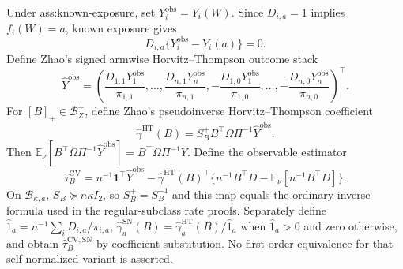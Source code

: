 Under ass:known-exposure, set \(Y_i^{\mathrm{obs}}=Y_i(W)\).  Since \(D_{i,a}=1\) implies \(f_i(W)=a\), known exposure gives
\[
D_{i,a}\{Y_i^{\mathrm{obs}}-Y_i(a)\}=0.
\]
Define Zhao's signed armwise Horvitz--Thompson outcome stack
\[
\widehat Y^{\mathrm{obs}}=
\left(\frac{D_{1,1}Y_1^{\mathrm{obs}}}{\pi_{1,1}},\ldots,
\frac{D_{n,1}Y_n^{\mathrm{obs}}}{\pi_{n,1}},
-\frac{D_{1,0}Y_1^{\mathrm{obs}}}{\pi_{1,0}},\ldots,
-\frac{D_{n,0}Y_n^{\mathrm{obs}}}{\pi_{n,0}}\right)^{\top}.
\]
For \([B]_+\in\mathcal B_Z^+\), define Zhao's pseudoinverse Horvitz--Thompson coefficient
\[
\widehat\gamma^{\mathrm{HT}}(B)=S_B^+B^{\top}\Omega\Pi^{-1}\widehat Y^{\mathrm{obs}}.
\]
Then \(\mathbb E_\nu[B^{\top}\Omega\Pi^{-1}\widehat Y^{\mathrm{obs}}]=B^{\top}\Omega\Pi^{-1}Y\).  Define the observable estimator
\[
\widehat\tau_B^{\mathrm{CV}}
=n^{-1}\mathbf1^{\top}\widehat Y^{\mathrm{obs}}
-\widehat\gamma^{\mathrm{HT}}(B)^{\top}
\{n^{-1}B^{\top}D-\mathbb E_\nu[n^{-1}B^{\top}D]\}.
\]
On \(\mathcal B_{\kappa,\overline a}\), \(S_B\succeq n\kappa I_2\), so \(S_B^+=S_B^{-1}\) and this map equals the ordinary-inverse formula used in the regular-subclass rate proofs.  Separately define \(\widehat1_a=n^{-1}\sum_iD_{i,a}/\pi_{i,a}\), \(\widehat\gamma_a^{\mathrm{SN}}(B)=\widehat\gamma_a^{\mathrm{HT}}(B)/\widehat1_a\) when \(\widehat1_a>0\) and zero otherwise, and obtain \(\widehat\tau_B^{\mathrm{CV,SN}}\) by coefficient substitution.  No first-order equivalence for that self-normalized variant is asserted.